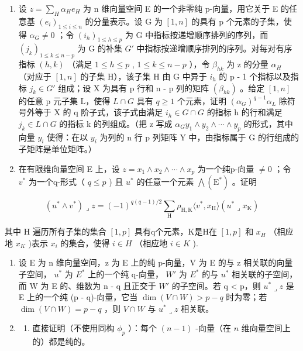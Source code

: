 \begin{enumerate}
\def\labelenumi{\arabic{enumi}.}
\setcounter{enumi}{17}
\item
  设 \(z = \sum_{H} \alpha_{H} e_{H}\) 为 n 维向量空间 E 的一个非零纯 p-向量，用它关于 E 的任意基 \((e_{i})_{1 \leqslant i \leqslant n}\) 的分量表示。设 G 为 \([1, n]\) 的具有 p 个元素的子集，使得 \(\alpha_{G} \neq 0\) ；令 \((i_{h})_{1 \leqslant h \leqslant p}\) 为 G 中指标按递增顺序排列的序列，而 \((j_{k})_{1 \leqslant k \leqslant n - p}\) 为 G 的补集 \(G'\) 中指标按递增顺序排列的序列。对每对有序指标 \((h, k)\) （满足 \(1 \leqslant h \leqslant p\) , \(1 \leqslant k \leqslant n - p\) ），令 \(\beta_{hk}\) 为 z 的分量 \(\alpha_{H}\) （对应于 \([1, n]\) 的子集 H），该子集 H 由 G 中异于 \(i_{h}\) 的 p - 1 个指标以及指标 \(j_{k} \in G'\) 组成；设 X 为具有 p 行和 n - p 列的矩阵 \((\beta_{hk})\) 。给定 \([1, n]\) 的任意 p 元子集 L，使得 \(L \cap G\) 具有 \(q \geqslant 1\) 个元素，证明 \((\alpha_{G})^{q-1} \alpha_{L}\) 除符号外等于 X 的 q 阶子式，该子式由满足 \(i_{h} \in G \cap G\) 的指标 h 的行和满足 \(j_{k} \in L \cap G\) 的指标 k 的列组成。（把 z 写成 \(\alpha_{G} y_{1} \wedge y_{2} \wedge \cdots \wedge y_{p}\) 的形式，其中向量 \(y_{i}\) 使得：在以 \(y_{i}\) 为列的 n 行 p 列矩阵 Y 中，由指标属于 G 的行组成的子矩阵是单位矩阵。）
\item
  在有限维向量空间 E 上，设 \(z = x_{1} \wedge x_{2} \wedge \cdots \wedge x_{p}\) 为一个纯p-向量 \(\neq 0\) ；令 \(v^{*}\) 为一个q-形式（ \(q \leqslant p\) ) 且 \(u^{*}\) 的任意一个元素 \(\bigwedge(\mathrm{E}^{*})\) 。证明
\end{enumerate}

\[
(u ^ {*} \wedge v ^ {*}) \lrcorner z = (- 1) ^ {q (q - 1) / 2} \sum_ {\mathrm{H}} \rho_ {\mathrm{H}, \mathrm{K}} \langle v ^ {*}, x _ {\mathrm{H}} \rangle (u ^ {*} \lrcorner x _ {\mathrm{K}})
\]

其中 H 遍历所有子集的集合 \([1, p]\) 具有q个元素，K是H在 \([1, p]\) 和 \(x_{H}\) （相应地 \(x_{K}\) )表示 \(x_{i}\) 的集合，使得 \(i \in H\) （相应地 \(i \in K\) ).

\begin{enumerate}
\def\labelenumi{\arabic{enumi}.}
\setcounter{enumi}{19}
\item
  设 E 为 n 维向量空间，z 为 E 上的纯 p-向量，V 为 E 的与 z 相关联的向量子空间， \(u^{*}\) 为 \(E^{*}\) 上的一个纯 q-向量， \(W'\) 为 \(E^{*}\) 的与 \(u^{*}\) 相关联的子空间，而 W 为 E 的、维数为 n - q 且正交于 \(W'\) 的子空间。若 q \textless{} p，则 \(u^{*} \lrcorner z\) 是 E 上的一个纯 (p - q)-向量，它当 \(\dim(V \cap W) > p - q\) 时为零；若 \(\dim(V \cap W) = p - q\) ，则 \(V \cap W\) 与 \(u^{*} \lrcorner z\) 相关联。
\item
  \begin{enumerate}
  \def\labelenumii{(\alph{enumii})}
  \tightlist
  \item
    直接证明（不使用同构 \(\phi_p\) ）：每个 \((n - 1)\) -向量（在 \(n\) 维向量空间上的）都是纯的。
  \end{enumerate}
\end{enumerate}

